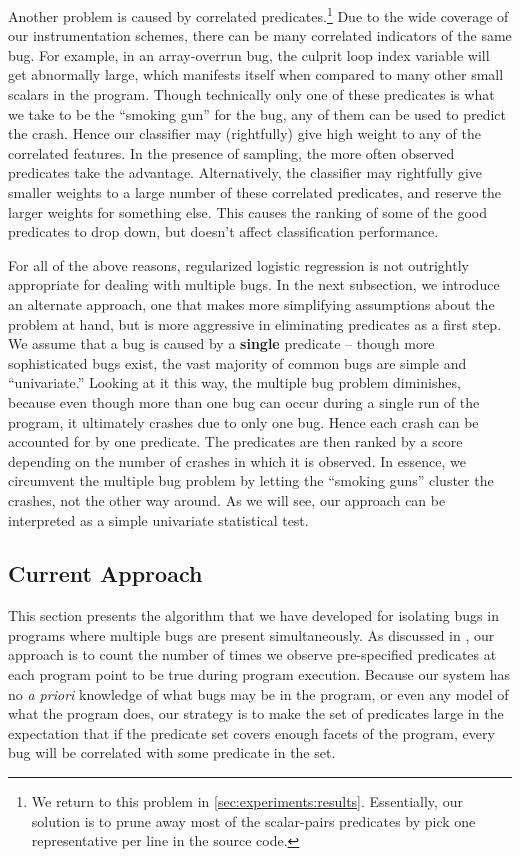 Another problem is caused by correlated predicates.\footnote{
We return to this problem in \autoref{sec:experiments:results}.
Essentially, our solution is to prune away most of the scalar-pairs
predicates by pick one representative per line in the source code.}
Due to the wide coverage of our instrumentation schemes, there can be
many correlated indicators of the same bug.  For example, in an
array-overrun bug, the culprit loop index variable will get abnormally
large, which manifests itself when compared to many other small
scalars in the program. Though technically only one of these
predicates is what we take to be the ``smoking gun'' for the bug, any
of them can be used to predict the crash.  Hence our classifier may
(rightfully) give high weight to any of the correlated features.  In
the presence of sampling, the more often observed predicates take the
advantage.  Alternatively, the classifier may rightfully give smaller
weights to a large number of these correlated predicates, and reserve
the larger weights for something else.  This causes the ranking of
some of the good predicates to drop down, but doesn't affect
classification performance.

For all of the above reasons, regularized logistic regression is not
outrightly appropriate for dealing with multiple bugs.  In the next
subsection, we introduce an alternate approach, one that makes more
simplifying assumptions about the problem at hand, but is more
aggressive in eliminating predicates as a first step.  We assume that
a bug is caused by a {\bf single} predicate -- though more
sophisticated bugs exist, the vast majority of common bugs are simple
and ``univariate.''  Looking at it this way, the multiple bug problem
diminishes, because even though more than one bug can occur during a
single run of the program, it ultimately crashes due to only one bug.
Hence each crash can be accounted for by one predicate.  The
predicates are then ranked by a score depending on the number of
crashes in which it is observed.  In essence, we circumvent the
multiple bug problem by letting the ``smoking guns'' cluster the
crashes, not the other way around.  As we will see, our approach can
be interpreted as a simple univariate statistical test.

\subsection{Current Approach}
This section presents the algorithm that we have developed for
isolating bugs in programs where multiple bugs are present
simultaneously.  As discussed in , our
approach is to count the number of times we observe pre-specified
predicates at each program point to be true during program
execution.  Because our system has no \textit{a priori} knowledge of
what bugs may be in the program, or even any model of what the program
does, our strategy is to make the set of predicates large in the
expectation that if the predicate set covers enough facets of the
program, every bug will be correlated with some predicate in the set.

